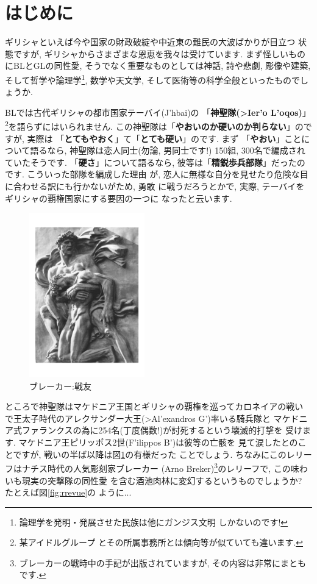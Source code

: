 \section{はじめに}

ギリシャといえば今や国家の財政破綻や中近東の難民の大波ばかりが目立つ
状態ですが, ギリシャからさまざまな恩恵を我々は受けています. まず怪しいもの
にBLとGLの同性愛, そうでなく重要なものとしては神話, 詩や悲劇, 彫像や建築,
 そして哲学や論理学\footnote{論理学を発明・発展させた民族は他にガンジス文明
しかないのです!}, 数学や天文学, そして医術等の科学全般といったものでしょうか. 
\newline

BLでは古代ギリシャの都市国家テーバイ(\textgreek{J'hbai})の
「\textbf{神聖隊(\textgreek{>Ier'o L'oqos})}」\footnote{某アイドルグループ
とその所属事務所とは傾向等が似ていても違います.}を語らずにはいられません.
 この神聖隊は「\textbf{やおいのか硬いのか判らない}」のですが, 実際は
「\textbf{とてもやおく}」て「\textbf{とても硬い}」のです. まず
「\textbf{やおい}」ことについて語るなら, 神聖隊は恋人同士(勿論, 男同士です!)
150組, 300名で編成されていたそうです. 「\textbf{硬さ}」について語るなら,
 彼等は「\textbf{精鋭歩兵部隊}」だったのです. こういった部隊を編成した理由
が, 恋人に無様な自分を見せたり危険な目に合わせる訳にも行かないがため, 勇敢
に戦うだろうとかで, 実際, テーバイをギリシャの覇権国家にする要因の一つに
なったと云います. 
\newline

\begin{figure}
\includegraphics[width=5cm]{arno_breker_kameradschaft.pdf}
\caption{ブレーカー:戦友}
\label{fig:breker2}
\end{figure}

ところで神聖隊はマケドニア王国とギリシャの覇権を巡ってカロネイアの戦い
で王太子時代のアレクサンダー大王(\textgreek{>Al'exandros G'})率いる騎兵隊と
マケドニア式ファランクスの為に254名(丁度偶数!)が討死するという壊滅的打撃を
受けます. マケドニア王ピリッポス2世(\textgreek{F'ilippos B'})は彼等の亡骸を
見て涙したとのことですが, 戦いの半ば以降は図\ref{fig:breker2}の有様だった
ことでしょう. ちなみにこのレリーフはナチス時代の人気彫刻家ブレーカー
(Arno Breker)\footnote{ブレーカーの戦時中の手記が出版されていますが,
 その内容は非常にまともです.}のレリーフで, この味わいも現実の突撃隊の同性愛
を含む酒池肉林に変幻するというものでしょうか? たとえば図\ref{fig:rrevue}の
ように... 

